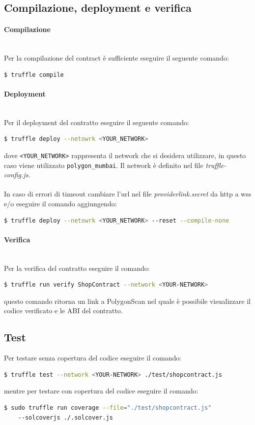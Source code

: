\documentclass[a4paper, 12pt]{article}
\begin{document}
\subsection{Compilazione, deployment e verifica}
\paragraph{Compilazione}\\
Per la compilazione del contract è sufficiente eseguire il seguente comando:
\begin{lstlisting}[language=bash]
  $ truffle compile
\end{lstlisting}
\paragraph{Deployment}\\
Per il deployment del contratto eseguire il seguente comando:
\begin{lstlisting}[language=bash]
  $ truffle deploy --netowrk <YOUR_NETWORK>
\end{lstlisting}
dove \verb|<YOUR_NETWORK>| rappresenta il network che si desidera utilizzare, in questo caso viene utilizzato \verb|polygon_mumbai|. Il network è definito nel file \textit{truffle-config.js}.\\ \\
In caso di errori di timeout cambiare l'url nel file \textit{providerlink.secret} da http a wss e/o eseguire il comando aggiungendo:
\begin{lstlisting}[language=bash]
  $ truffle deploy --netowrk <YOUR_NETWORK> --reset --compile-none
\end{lstlisting}
\paragraph{Verifica}\\
Per la verifica del contratto eseguire il comando:
\begin{lstlisting}[language=bash]
  $ truffle run verify ShopContract --network <YOUR-NETWORK>
\end{lstlisting}
questo comando ritorna un link a PolygonScan nel quale è possibile visualizzare il codice verificato e le ABI del contratto.
\subsection{Test}
Per testare senza copertura del codice eseguire il comando:
\begin{lstlisting}[language=bash]
  $ truffle test --network <YOUR-NETWORK> ./test/shopcontract.js
\end{lstlisting}
mentre per testare con copertura del codice eseguire il comando:
\begin{lstlisting}[language=bash]
  $ sudo truffle run coverage --file="./test/shopcontract.js"
    --solcoverjs ./.solcover.js
\end{lstlisting}
\end{document}
